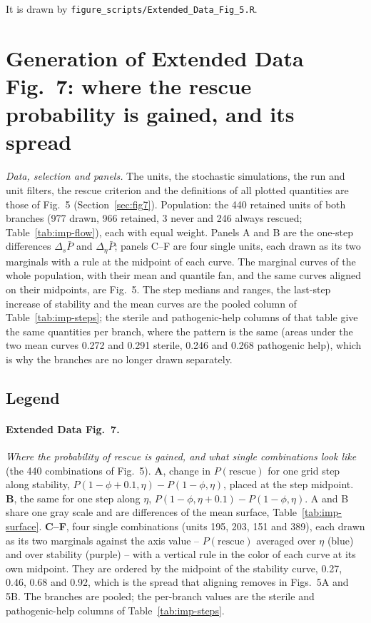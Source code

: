 \documentclass[11pt]{article}
\begin{document}
\label{sec:figS04}

It is drawn by \texttt{figure\_scripts/Extended\_Data\_Fig\_5.R}.

\section{Generation of Extended Data Fig.~7: where the rescue probability is gained, and its spread}
\label{sec:figS05}

\emph{Data, selection and panels.} The units, the stochastic simulations, the run and
unit filters, the rescue criterion and the definitions of all plotted quantities are
those of Fig.~5 (Section~\ref{sec:fig7}). Population: the 440 retained units of both
branches (977 drawn, 966 retained, 3 never and 246 always rescued;
Table~\ref{tab:imp-flow}), each with equal weight. Panels A and B are the one-step
differences $\Delta_s \bar P$ and $\Delta_\eta \bar P$; panels C--F are four single
units, each drawn as its two marginals with a rule at the midpoint of each curve.
The marginal curves of the whole population, with their mean and quantile fan, and
the same curves aligned on their midpoints, are Fig.~5. The step
medians and ranges, the last-step increase of stability and the mean curves are the
pooled column of Table~\ref{tab:imp-steps}; the sterile and pathogenic-help columns of
that table give the same quantities per branch, where the pattern is the same (areas
under the two mean curves 0.272 and 0.291 sterile, 0.246 and 0.268 pathogenic help),
which is why the branches are no longer drawn separately.

\subsection{Legend}

\paragraph{Extended Data Fig.~7.}
\emph{Where the probability of rescue is gained, and what single combinations
look like} (the 440 combinations of Fig.~5). \textbf{A}, change in
$P(\text{rescue})$ for one grid step along stability,
$P(1-\phi + 0.1, \eta) - P(1-\phi, \eta)$, placed at the step midpoint.
\textbf{B}, the same for one step along $\eta$,
$P(1-\phi, \eta + 0.1) - P(1-\phi, \eta)$. A and B share one gray scale and are
differences of the mean surface, Table~\ref{tab:imp-surface}. \textbf{C--F},
four single combinations (units 195, 203, 151 and 389), each drawn as its two
marginals against the axis value -- $P(\text{rescue})$ averaged over $\eta$
(blue) and over stability (purple) -- with a vertical rule in the color of each
curve at its own midpoint. They are ordered by the midpoint of the stability
curve, 0.27, 0.46, 0.68 and 0.92, which is the spread that aligning removes in
 Figs.~5A and 5B. The branches are pooled; the per-branch values are the
sterile and pathogenic-help columns of Table~\ref{tab:imp-steps}.
\end{document}
